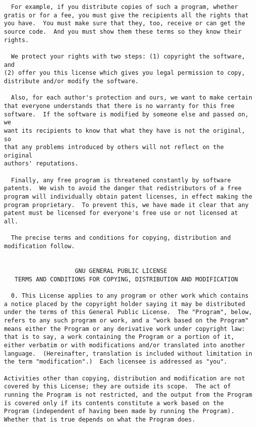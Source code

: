 \documentclass{article}
\begin{document}
\begin{appendix}
\begin{verbatim}
  For example, if you distribute copies of such a program, whether
gratis or for a fee, you must give the recipients all the rights that
you have.  You must make sure that they, too, receive or can get the
source code.  And you must show them these terms so they know their
rights.

  We protect your rights with two steps: (1) copyright the software, and
(2) offer you this license which gives you legal permission to copy,
distribute and/or modify the software.

  Also, for each author's protection and ours, we want to make certain
that everyone understands that there is no warranty for this free
software.  If the software is modified by someone else and passed on, we
want its recipients to know that what they have is not the original, so
that any problems introduced by others will not reflect on the original
authors' reputations.

  Finally, any free program is threatened constantly by software
patents.  We wish to avoid the danger that redistributors of a free
program will individually obtain patent licenses, in effect making the
program proprietary.  To prevent this, we have made it clear that any
patent must be licensed for everyone's free use or not licensed at all.

  The precise terms and conditions for copying, distribution and
modification follow.


                    GNU GENERAL PUBLIC LICENSE
   TERMS AND CONDITIONS FOR COPYING, DISTRIBUTION AND MODIFICATION

  0. This License applies to any program or other work which contains
a notice placed by the copyright holder saying it may be distributed
under the terms of this General Public License.  The "Program", below,
refers to any such program or work, and a "work based on the Program"
means either the Program or any derivative work under copyright law:
that is to say, a work containing the Program or a portion of it,
either verbatim or with modifications and/or translated into another
language.  (Hereinafter, translation is included without limitation in
the term "modification".)  Each licensee is addressed as "you".

Activities other than copying, distribution and modification are not
covered by this License; they are outside its scope.  The act of
running the Program is not restricted, and the output from the Program
is covered only if its contents constitute a work based on the
Program (independent of having been made by running the Program).
Whether that is true depends on what the Program does.


\end{verbatim}
\end{appendix}
\end{document}
